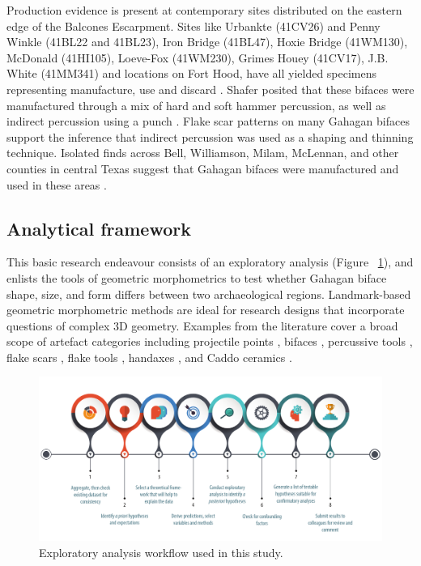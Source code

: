 \documentclass[review]{elsarticle}
\begin{document}
Production evidence is present at contemporary sites distributed on the eastern edge of the Balcones Escarpment. Sites like Urbankte (41CV26) and Penny Winkle (41BL22 and 41BL23), Iron Bridge (41BL47), Hoxie Bridge (41WM130), McDonald (41HI105), Loeve-Fox (41WM230), Grimes Houey (41CV17), J.B. White (41MM341) and locations on Fort Hood, have all yielded specimens representing manufacture, use and discard \citep{RN20717,RN11565,RN2708,RN20718,RN4924,RN20719}. Shafer posited that these bifaces were manufactured through a mix of hard and soft hammer percussion, as well as indirect percussion using a punch \citep{RN4924,RN3684}. Flake scar patterns on many Gahagan bifaces support the inference that indirect percussion was used as a shaping and thinning technique. Isolated finds across Bell, Williamson, Milam, McLennan, and other counties in central Texas suggest that Gahagan bifaces were manufactured and used in these areas \citep{RN4924}.

\subsection*{Analytical framework}

This basic research endeavour \citep{RN20851} consists of an exploratory analysis (Figure ~\ref{fig:exan}), and enlists the tools of geometric morphometrics to test whether Gahagan biface shape, size, and form differs between two archaeological regions. Landmark-based geometric morphometric methods are ideal for research designs that incorporate questions of complex 3D geometry. Examples from the literature cover a broad scope of artefact categories including projectile points \citep{RN1750,RN1755}, bifaces \citep{RN1727,RN4392,RN11550,RN11783}, percussive tools \citep{RN1772}, flake scars \citep{RN253}, flake tools \citep{RN11552}, handaxes \citep{RN1730,RN1766,RN3145,RN1733,RN335}, and Caddo ceramics \citep{RN1994,RN11521,RN11782,RN11801,RN11716,RN20852}. 

\begin{figure}[ht]\centering
\includegraphics[width=\linewidth]{figexan.pdf}
\caption{Exploratory analysis workflow used in this study.}
\label{fig:exan}
\end{figure}
\end{document}
